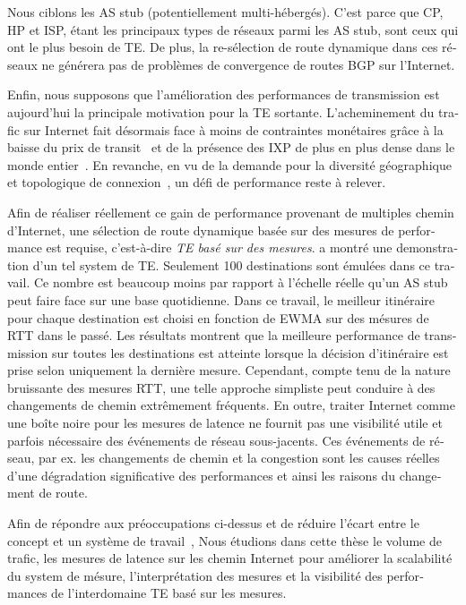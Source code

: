 \begin{otherlanguage}{french}
Nous ciblons les \acf{AS} stub (potentiellement multi-hébergés).
C'est parce que \acf{CP}, \acf{HP} et \acf{ISP}, étant les principaux types de réseaux parmi les AS stub, sont ceux qui ont le plus besoin de TE.
De plus, la re-sélection de route dynamique dans ces réseaux ne générera pas de problèmes de convergence de routes BGP sur l'Internet.

Enfin, nous supposons que l'amélioration des performances de transmission est aujourd'hui la principale motivation pour la TE sortante.
L'acheminement du trafic sur Internet fait désormais face à moins de contraintes monétaires grâce à la baisse du prix de transit~\cite{transitprice, drpeering} et de la présence des \ac{IXP} de plus en plus dense dans le monde entier~\cite{pchixp}.
En revanche, en vu de la demande pour la diversité géographique et topologique de connexion~\cite {Chiu2015}, un défi de performance reste à relever.

Afin de réaliser réellement ce gain de performance provenant de multiples chemin d'Internet, une sélection de route dynamique basée sur des mesures de performance est requise, c'est-à-dire \textit{TE basé sur des mesures}.
\citet{Akella2008} a montré une demonstration d'un tel system de TE.
Seulement 100 destinations sont émulées dans ce travail.
Ce nombre est beaucoup moins par rapport à l'échelle réelle qu'un AS stub peut faire face sur une base quotidienne.
Dans ce travail, le meilleur itinéraire pour chaque destination est choisi en fonction de \ac{EWMA} sur des mésures de \acf {RTT} dans le passé.
Les résultats montrent que la meilleure performance de transmission sur toutes les destinations est atteinte lorsque la décision d'itinéraire est prise selon uniquement la dernière mesure.
Cependant, compte tenu de la nature bruissante des mesures \ac{RTT}, une telle approche simpliste peut conduire à des changements de chemin extrêmement fréquents.
En outre, traiter Internet comme une boîte noire pour les mesures de latence ne fournit pas une visibilité utile et parfois nécessaire des événements de réseau sous-jacents.
Ces événements de réseau, par ex. les changements de chemin et la congestion sont les causes réelles d'une dégradation significative des performances et ainsi les raisons du changement de route.

Afin de répondre aux préoccupations ci-dessus et de réduire l'écart entre le concept et un système de travail~\cite{b6},
Nous étudions dans cette thèse le volume de trafic, les mesures de latence sur les chemin Internet pour améliorer la scalabilité du system de mésure, l'interprétation des mesures et la visibilité des performances de l'interdomaine TE basé sur les mesures.


\end{otherlanguage}

